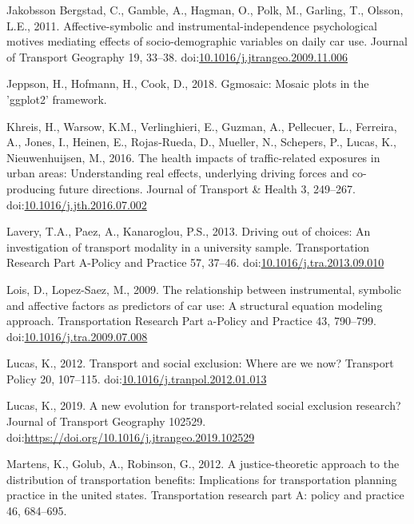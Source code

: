 \documentclass[]{elsarticle} %
\begin{document}
\leavevmode\hypertarget{ref-Bergstad2011affective}{}%
Jakobsson Bergstad, C., Gamble, A., Hagman, O., Polk, M., Garling, T.,
Olsson, L.E., 2011. Affective-symbolic and instrumental-independence
psychological motives mediating effects of socio-demographic variables
on daily car use. Journal of Transport Geography 19, 33--38.
doi:\href{https://doi.org/10.1016/j.jtrangeo.2009.11.006}{10.1016/j.jtrangeo.2009.11.006}

\leavevmode\hypertarget{ref-Jeppson2019ggmosaic}{}%
Jeppson, H., Hofmann, H., Cook, D., 2018. Ggmosaic: Mosaic plots in the
'ggplot2' framework.

\leavevmode\hypertarget{ref-Khreis2016health}{}%
Khreis, H., Warsow, K.M., Verlinghieri, E., Guzman, A., Pellecuer, L.,
Ferreira, A., Jones, I., Heinen, E., Rojas-Rueda, D., Mueller, N.,
Schepers, P., Lucas, K., Nieuwenhuijsen, M., 2016. The health impacts of
traffic-related exposures in urban areas: Understanding real effects,
underlying driving forces and co-producing future directions. Journal of
Transport \& Health 3, 249--267.
doi:\href{https://doi.org/10.1016/j.jth.2016.07.002}{10.1016/j.jth.2016.07.002}

\leavevmode\hypertarget{ref-Lavery2013driving}{}%
Lavery, T.A., Paez, A., Kanaroglou, P.S., 2013. Driving out of choices:
An investigation of transport modality in a university sample.
Transportation Research Part A-Policy and Practice 57, 37--46.
doi:\href{https://doi.org/10.1016/j.tra.2013.09.010}{10.1016/j.tra.2013.09.010}

\leavevmode\hypertarget{ref-Lois2009relationship}{}%
Lois, D., Lopez-Saez, M., 2009. The relationship between instrumental,
symbolic and affective factors as predictors of car use: A structural
equation modeling approach. Transportation Research Part a-Policy and
Practice 43, 790--799.
doi:\href{https://doi.org/10.1016/j.tra.2009.07.008}{10.1016/j.tra.2009.07.008}

\leavevmode\hypertarget{ref-Lucas2012transport}{}%
Lucas, K., 2012. Transport and social exclusion: Where are we now?
Transport Policy 20, 107--115.
doi:\href{https://doi.org/10.1016/j.tranpol.2012.01.013}{10.1016/j.tranpol.2012.01.013}

\leavevmode\hypertarget{ref-Lucas2019evolution}{}%
Lucas, K., 2019. A new evolution for transport-related social exclusion
research? Journal of Transport Geography 102529.
doi:\href{https://doi.org/https://doi.org/10.1016/j.jtrangeo.2019.102529}{https://doi.org/10.1016/j.jtrangeo.2019.102529}

\leavevmode\hypertarget{ref-Martens2012justice}{}%
Martens, K., Golub, A., Robinson, G., 2012. A justice-theoretic approach
to the distribution of transportation benefits: Implications for
transportation planning practice in the united states. Transportation
research part A: policy and practice 46, 684--695.
\end{document}
